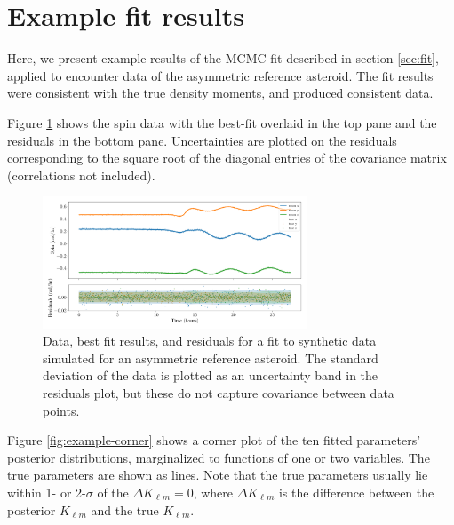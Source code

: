 \documentclass[fleqn,usenatbib]{mnras}
\begin{document}
\section{Example fit results}
\label{app:example}

Here, we present example results of the MCMC fit described in section \ref{sec:fit}, applied to encounter data of the asymmetric reference asteroid. The fit results were consistent with the true density moments, and produced consistent data.

Figure \ref{fig:example-residuals} shows the spin data with the best-fit overlaid in the top pane and the residuals in the bottom pane. Uncertainties are plotted on the residuals corresponding to the square root of the diagonal entries of the covariance matrix (correlations not included).

\begin{figure}
  \centering
  \includegraphics[width=0.7\textwidth]{figs/example-residuals.pdf}
  \caption{Data, best fit results, and residuals for a fit to synthetic data simulated for an asymmetric reference asteroid. The standard deviation of the data is plotted as an uncertainty band in the residuals plot, but these do not capture covariance between data points.}
  \label{fig:example-residuals}
\end{figure}

Figure \ref{fig:example-corner} shows a corner plot of the ten fitted parameters' posterior distributions, marginalized to functions of one or two variables. The true parameters are shown as lines. Note that the true parameters usually lie within 1- or 2-$\sigma$ of the $\Delta K_{\ell m} = 0$, where $\Delta K_{\ell m}$ is the difference between the posterior $K_{\ell m}$ and the true $K_{\ell m}$.
\end{document}
